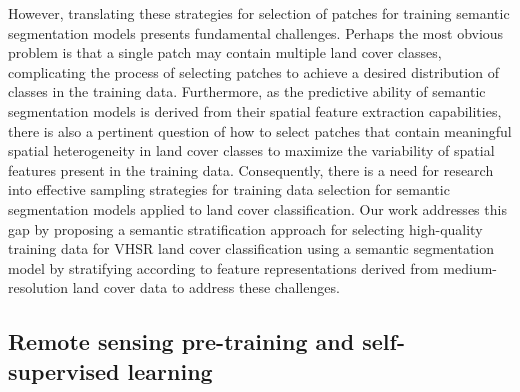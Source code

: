 
However, translating these strategies for selection of patches for training semantic segmentation models presents fundamental challenges.
Perhaps the most obvious problem is that a single patch may contain multiple land cover classes, complicating the process of selecting patches to achieve a desired distribution of classes in the training data.
Furthermore, as the predictive ability of semantic segmentation models is derived from their spatial feature extraction capabilities, there is also a pertinent question of how to select patches that contain meaningful spatial heterogeneity in land cover classes to maximize the variability of spatial features present in the training data.
Consequently, there is a need for research into effective sampling strategies for training data selection for semantic segmentation models applied to land cover classification.
Our work addresses this gap by proposing a semantic stratification approach for selecting high-quality training data for VHSR land cover classification using a semantic segmentation model by stratifying according to feature representations derived from medium-resolution land cover data to address these challenges.


\subsection{Remote sensing pre-training and self-supervised learning}

